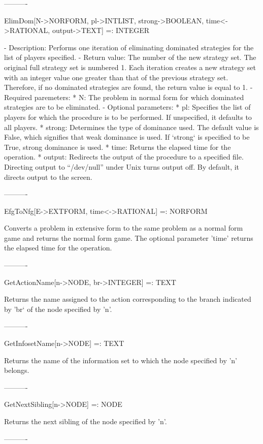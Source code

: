 ----------

ElimDom[N->NORFORM, {pl->INTLIST}, {strong->BOOLEAN}, {time<->RATIONAL},
	{output->TEXT}] =: INTEGER

   -	Description:  Performs one iteration of eliminating dominated 
	strategies for the list of players specified.  
   -	Return value:  The number of the new strategy set.  The original full
	strategy set is numbered 1.  Each iteration creates a new strategy set
	with an integer value one greater than that of the previous strategy 
	set.  Therefore, if no dominated strategies are found, the return value
	is equal to 1.
   -	Required paremeters:
	  *  N:  The problem in normal form for which dominated strategies are
	     to be eliminated.
   -	Optional parameters:
	  *  pl:  Specifies the list of players for which the procedure is to
	     be performed.  If unspecified, it defaults to all players. 
 	  *  strong:  Determines the type of dominance used.  The default value
	     is False, which signifies that weak dominance is used.  If 
	     `strong` is specified to be True, strong dominance is used.  
	  *  time:  Returns the elapsed time for the operation.
	  *  output:  Redirects the output of the procedure to a specified 
	     file.  Directing output to ``/dev/null'' under Unix turns output
	     off.  By default, it directs output to the screen.

----------

EfgToNfg[E->EXTFORM, {time<->RATIONAL}] =: NORFORM

	Converts a problem in extensive form to the same problem as a normal
form game and returns the normal form game.  The optional parameter 'time'
returns the elapsed time for the operation.

----------

GetActionName[n->NODE, br->INTEGER] =: TEXT

	Returns the name assigned to the action corresponding to the branch
indicated by 'br` of the node specified by 'n'.

----------

GetInfosetName[n->NODE] =: TEXT

	Returns the name of the information set to which the node specified by
'n' belongs.

----------

GetNextSibling[n->NODE] =: NODE

	Returns the next sibling of the node specified by 'n'.

----------

